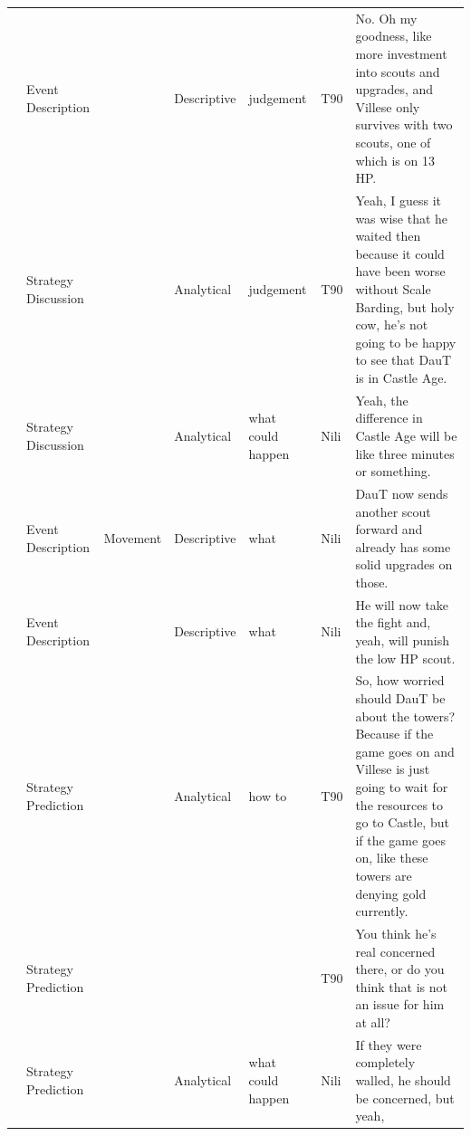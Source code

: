 {\begin{longtable}{@{}>{\theAppRow}r|L{2.3cm}L{2.2cm}L{1.4cm}L{2.2cm}L{0.5cm}U{5.6cm}@{}}
    & Event Description     &                      & Descriptive   & judgement         & T90     & No. Oh my goodness, like more investment into scouts and upgrades, and Villese only survives with two scouts, one of which is on 13 HP.                                                                                  \\
    & Strategy Discussion   &                      & Analytical  & judgement         & T90     & Yeah, I guess it was wise that he waited then because it could have been worse without Scale Barding, but holy cow, he's not going to be happy to see that DauT is in Castle Age.                                        \\
    & Strategy Discussion   &                      & Analytical  & what could happen & Nili    & Yeah, the difference in Castle Age will be like three minutes or something.                                                                                                                                              \\
    & Event Description     & Movement             & Descriptive   & what              & Nili    & DauT now sends another scout forward and already has some solid upgrades on those.                                                                                                                                       \\
    & Event Description     &                      & Descriptive   & what              & Nili    & He will now take the fight and, yeah, will punish the low HP scout.                                                                                                                                                      \\
    & Strategy Prediction   &                      & Analytical  & how to            & T90     & So, how worried should DauT be about the towers? Because if the game goes on and Villese is just going to wait for the resources to go to Castle, but if the game goes on, like these towers are denying gold currently. \\
    & Strategy Prediction   &                      &             &                   & T90     & You think he's real concerned there, or do you think that is not an issue for him at all?                                                                                                                                \\
    & Strategy Prediction   &                      & Analytical  & what could happen & Nili    & If they were completely walled, he should be concerned, but yeah,                                                                                                                                                        \\

\end{longtable}}
